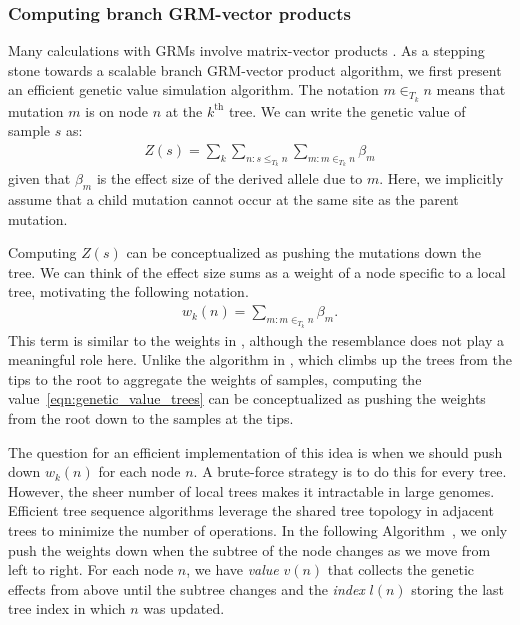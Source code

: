 \subsubsection{Computing branch GRM-vector products}

Many calculations with GRMs involve matrix-vector products
\citep{colleau2002indirect, colleau2017fast}.
%
As a stepping stone towards a scalable branch GRM-vector product algorithm,
we first present an efficient genetic value simulation algorithm.
%
The notation $m \in_{T_k} n$ means that mutation $m$ is on node $n$ at the $k^{\text{th}}$ tree.
%
We can write the genetic value of sample $s$ as:
%
\begin{align} \label{eqn:genetic_value_trees}
    Z(s) = \sum_k \sum_{n: s\le_{T_k} n} \sum_{m:m \in_{T_k} n} \beta_m
\end{align}
%
given that $\beta_m$ is the effect size of the derived allele due to $m$.
%
Here, we implicitly assume that a child mutation cannot occur at the same site as the parent mutation.

Computing $Z(s)$ can be conceptualized as pushing the mutations down the tree.
%
We can think of the effect size sums as a weight of a node specific to a local tree,
motivating the following notation.
%
\begin{align}
    w_k(n) = \sum_{m: m \in_{T_k} n} \beta_m .
\end{align}
%
This term is similar to the weights in \citet{ralph2020efficiently},
although the resemblance does not play a meaningful role here.
%
Unlike the algorithm in \citet{ralph2020efficiently},
which climbs up the trees from the tips to the root to aggregate the weights of samples,
computing the value~\eqref{eqn:genetic_value_trees} can be conceptualized as
pushing the weights from the root down to the samples at the tips.

The question for an efficient implementation of this idea
is when we should push down $w_k(n)$ for each node $n$.
%
A brute-force strategy is to do this for every tree.
%
However, the sheer number of local trees makes it intractable in large genomes.
%
Efficient tree sequence algorithms leverage the shared tree topology
in adjacent trees to minimize the number of operations.
%
In the following Algorithm~,
we only push the weights down when the subtree of the node changes
as we move from left to right.
%
For each node $n$, we have \textit{value} $v(n)$ that collects the genetic effects from above until the subtree changes and
the \textit{index} $l(n)$ storing the last tree index in which $n$ was updated.

